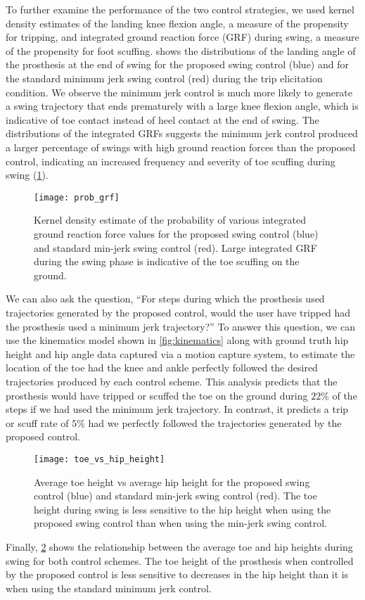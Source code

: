 To further examine the performance of the two control strategies, we used kernel
density estimates of the landing knee flexion angle, a measure of the propensity
for tripping, and integrated ground reaction force (GRF) during swing, a measure
of the propensity for foot scuffing.  shows the
distributions of the landing angle of the prosthesis at the end of swing for the
proposed swing control (blue) and for the standard minimum jerk swing control
(red) during the trip elicitation condition. We observe the minimum jerk control
is much more likely to generate a swing trajectory that ends prematurely with a
large knee flexion angle, which is indicative of toe contact instead of heel
contact at the end of swing.  The distributions of the integrated GRFs suggests
the minimum jerk control produced a larger percentage of swings with high ground
reaction forces than the proposed control, indicating an increased frequency and
severity of toe scuffing during swing (\cref{fig:p_grf}). 
\begin{figure}[t]
    \centering
    \texttt{[image: prob\_grf]}
    \caption{Kernel density estimate of the probability of various integrated
    ground reaction force values for the proposed swing control (blue) and
    standard min-jerk swing control (red). Large integrated GRF during the swing
    phase is indicative of the toe scuffing on the ground.}
    \label{fig:p_grf}
\end{figure}

We can also ask the question, ``For steps during which the prosthesis used
trajectories generated by the proposed control, would the user have tripped had
the prosthesis used a minimum jerk trajectory?'' To answer this question, we can
use the kinematics model shown in \cref{fig:kinematics} along with ground truth
hip height and hip angle data captured via a motion capture system, to estimate
the location of the toe had the knee and ankle perfectly followed the desired
trajectories produced by each control scheme. This analysis predicts that the
prosthesis would have tripped or scuffed the toe on the ground during $22\%$ of
the steps if we had used the minimum jerk trajectory. In contrast, it predicts a
trip or scuff rate of $5\%$ had we perfectly followed the trajectories generated
by the proposed control.

\begin{figure}[t]
    \centering
    \texttt{[image: toe\_vs\_hip\_height]}
    \caption{Average toe height vs average hip height for the proposed swing
    control (blue) and standard min-jerk swing control (red). The toe height
    during swing is less sensitive to the hip height when using the proposed
    swing control than when using the min-jerk swing control.}
    \label{fig:toe_vs_hip}
\end{figure}

Finally, \cref{fig:toe_vs_hip} shows the relationship between the average
toe and hip heights during swing for both control schemes. The toe height of the
prosthesis when controlled by the proposed control is less sensitive to
decreases in the hip height than it is when using the standard minimum jerk
control.
